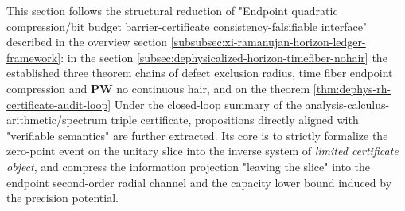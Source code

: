 \label{subsec:xi-certificate-coherence-orthogonal-axis-capacity-part1}

This section follows the structural reduction of "Endpoint quadratic compression/bit budget barrier-certificate consistency-falsifiable interface" described in the overview section \ref{subsubsec:xi-ramanujan-horizon-ledger-framework}: in the section \ref{subsec:dephysicalized-horizon-timefiber-nohair} the established three theorem chains of defect exclusion radius, time fiber endpoint compression and \(\mathbf{PW}\) no continuous hair, and on the theorem \ref{thm:dephys-rh-certificate-audit-loop} Under the closed-loop summary of the analysis-calculus-arithmetic/spectrum triple certificate, propositions directly aligned with "verifiable semantics" are further extracted. Its core is to strictly formalize the zero-point event on the unitary slice into the inverse system of \emph{limited certificate object}, and compress the information projection "leaving the slice" into the endpoint second-order radial channel and the capacity lower bound induced by the precision potential.

